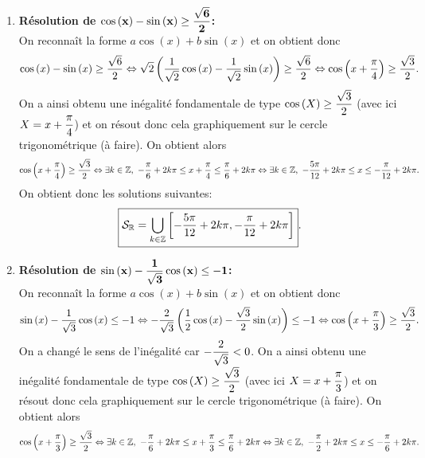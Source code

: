 \documentclass[a4paper, 11pt]{article}
\begin{document}
\begin{correction}
\begin{enumerate}
La r\'esolution sur le cercle trigonom\'etrique (\`a faire) donne 
$$\fbox{$\mathcal{S}= \ddp \mathop{\bigcup}\limits_{k\in \Z} \left[ -\ddp\frac{5\pi}{6}+2k\pi, -\ddp\frac{3\pi}{4}+2k\pi \right] \cup \left[ -\ddp\frac{\pi}{4}+2k\pi, -\ddp\frac{\pi}{6}+2k\pi \right] \cup \left[ \ddp\frac{\pi}{6}+2k\pi,  \ddp\frac{\pi}{4}+2k\pi \right] \cup\left[ \ddp\frac{3\pi}{4}+2k\pi, \ddp\frac{5\pi}{6}+2k\pi\right]$}.$$
\item \textbf{R\'esolution de $\mathbf{\cos{(x)}-\sin{(x)}\geq \displaystyle\frac{\sqrt{6}}{2}   }$:}\\
\noindent On reconna\^{i}t la forme $a\cos{(x)}+b\sin{(x)}$ et on obtient donc
$$\cos{(x)}-\sin{(x)}\geq \displaystyle\frac{\sqrt{6}}{2} \Leftrightarrow \sqrt{2}\left( \displaystyle\frac{1}{\sqrt{2}} \cos{(x)}-\displaystyle\frac{1}{\sqrt{2}}\sin{(x)}  \right)\geq \displaystyle\frac{\sqrt{6}}{2}\Leftrightarrow \cos{\left(x  +\displaystyle\frac{\pi}{4} \right)}\geq \displaystyle\frac{\sqrt{3}}{2}.$$
On a ainsi obtenu une in\'egalit\'e fondamentale de type $\cos{(X)}\geq \displaystyle\frac{\sqrt{3}}{2}$ (avec ici $X=x+\displaystyle\frac{\pi}{4}$) et on r\'esout donc cela graphiquement sur le cercle trigonom\'etrique (\`a faire). On obtient alors
$$\cos{\left(x  +\ddp\frac{\pi}{4} \right)}\geq \ddp\frac{\sqrt{3}}{2} \Leftrightarrow \exists k\in\Z,\ -\ddp\frac{\pi}{6}+2k\pi\leq x+\ddp\frac{\pi}{4}\leq \ddp\frac{\pi}{6}+2k\pi\Leftrightarrow  \exists k\in\Z,\ -\ddp\frac{5\pi}{12}+2k\pi\leq x\leq -\ddp\frac{\pi}{12}+2k\pi.$$
On obtient donc les solutions suivantes:
$$\fbox{$\mathcal{S}_{\mathbb{R}}= \displaystyle \mathop{\bigcup}\limits_{k\in \mathbb{Z}} \left[  -\displaystyle\frac{5\pi}{12}+2k\pi, -\displaystyle\frac{\pi}{12}+2k\pi \right]$}.$$
\item \textbf{R\'esolution de $\mathbf{\sin{(x)}-\displaystyle\frac{1}{\sqrt{3}}\cos{(x)}\leq -1}$:}\\
\noindent On reconna\^{i}t la forme $a\cos{(x)}+b\sin{(x)}$ et on obtient donc
$$\sin{(x)}-\displaystyle\frac{1}{\sqrt{3}}\cos{(x)}\leq -1 \Leftrightarrow -\displaystyle\frac{2}{\sqrt{3}}\left( \displaystyle\frac{1}{2} \cos{(x)}-\displaystyle\frac{\sqrt{3}}{2}\sin{(x)}  \right)\leq -1\Leftrightarrow \cos{\left(x  +\displaystyle\frac{\pi}{3} \right)}\geq \displaystyle\frac{\sqrt{3}}{2}.$$
On a chang\'e le sens de l'in\'egalit\'e car $-\displaystyle\frac{2}{\sqrt{3}}<0$. On a ainsi obtenu une in\'egalit\'e fondamentale de type $\cos{(X)}\geq \displaystyle\frac{\sqrt{3}}{2}$ (avec ici $X=x+\displaystyle\frac{\pi}{3}$) et on r\'esout donc cela graphiquement sur le cercle trigonom\'etrique (\`a faire). On obtient alors
$$\cos{\left(x  +\ddp\frac{\pi}{3} \right)}\geq \ddp\frac{\sqrt{3}}{2} \Leftrightarrow \exists k\in\Z,\ -\ddp\frac{\pi}{6}+2k\pi\leq x+\ddp\frac{\pi}{3}\leq \ddp\frac{\pi}{6}+2k\pi\Leftrightarrow  \exists k\in\Z,\ -\ddp\frac{\pi}{2}+2k\pi\leq x\leq -\ddp\frac{\pi}{6}+2k\pi.$$

\end{enumerate}
\end{correction}
\end{document}

